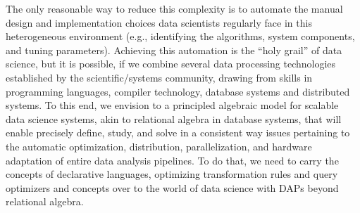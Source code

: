 \documentclass[a4paper,UKenglish]{dagrep-v2018}
\begin{document}
The only reasonable way to reduce this complexity is to automate the manual design and implementation choices data scientists regularly face in this heterogeneous environment (e.g., identifying the algorithms, system components, and tuning parameters). Achieving this automation is the “holy grail” of data science, but it is possible, if we combine several data processing technologies established by the scientific/systems community, drawing from skills in programming languages, compiler technology, database systems and distributed systems.
To this end, we envision to a principled algebraic model for scalable data science systems, akin to relational algebra in database systems, that will enable precisely define, study, and solve in a consistent way issues pertaining to the automatic optimization, distribution, parallelization, and hardware adaptation of entire data analysis pipelines. To do that, we need to carry the concepts of declarative languages, optimizing transformation rules and query optimizers and concepts over to the world of data science with DAPs beyond relational algebra.









\newpage
\end{document}
